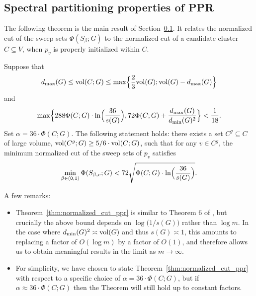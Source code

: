 \subsection{Spectral partitioning properties of PPR}
\label{subsec:ppr_spectral_partitioning}
The following theorem is the main result of Section~\ref{subsec:ppr_spectral_partitioning}. It relates the normalized cut of the sweep sets $\Phi(S_{\beta};G)$ to the normalized cut of a candidate cluster $C \subseteq V$, when $p_v$ is properly initialized within $C$.

\begin{theorem}
	\label{thm:normalized_cut_ppr}
	Suppose that
	\begin{equation}
	\label{eqn:normalized_cut_ppr_vol}
	d_{\max}(G) \leq \mathrm{vol}(C;G) \leq \max\Bigl\{\frac{2}{3}\mathrm{vol}(G); \mathrm{vol}(G) - d_{\max}(G)\Bigr\}
	\end{equation}
	and
	\begin{equation}
	\label{eqn:normalized_cut_ppr_ncut}
	\max\Bigl\{288\Phi(C;G)\cdot \ln\Bigl(\frac{36}{s(G)}\Bigr),72\Phi(C;G) + \frac{d_{\max}(G)}{d_{\min}(G)^2}\Bigr\} < \frac{1}{18}.
	\end{equation}
	Set $\alpha = 36 \cdot \Phi(C;G)$. The following statement holds: there exists a set $C^g \subseteq C$ of large volume, $\mathrm{vol}(C^g;G) \geq 5/6 \cdot \mathrm{vol}(C;G)$, such that for any $v \in C^g$,  the minimum normalized cut of the sweep sets of $p_v$ satisfies 
	\begin{equation}
	\label{eqn:normalized_cut_ppr}
	\min_{\beta \in (0,1)}\Phi(S_{\beta,v};G) < 72\sqrt{\Phi(C;G) \cdot \ln\Bigl(\frac{36}{s(G)}\Bigr)}.
	\end{equation}
\end{theorem}
A few remarks:
\begin{itemize}
	\item Theorem~\ref{thm:normalized_cut_ppr} is similar to Theorem 6 of \citet{andersen2006}, but crucially the above bound depends on $\log\bigl(1/s(G)\bigr)$ rather than $\log m$. In the case where $d_{\min}(G)^2 \asymp \mathrm{vol}(G)$ and thus $s(G) \asymp 1$, this amounts to replacing a factor of $O(\log m)$ by a factor of ${O}(1)$, and therefore allows us to obtain meaningful results in the limit as $m \to \infty$. 
	\item For simplicity, we have chosen to state Theorem~\ref{thm:normalized_cut_ppr} with respect to a specific choice of $\alpha = 36 \cdot \Phi(C;G)$, but if $\alpha \approx 36 \cdot \Phi(C;G)$ then the Theorem will still hold up to constant factors.
\end{itemize}

